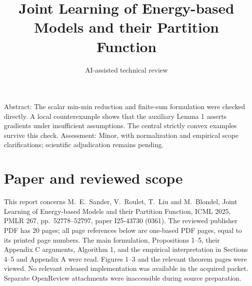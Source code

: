 \documentclass[10pt]{article}
\title{Joint Learning of Energy-based Models and their Partition Function}
\author{AI-assisted technical review}
\date{}
\begin{document}
\maketitle
Abstract: The scalar min-min reduction and finite-sum formulation were checked directly. A local counterexample shows that the auxiliary Lemma 1 asserts gradients under insufficient assumptions. The central strictly convex examples survive this check. Assessment: Minor, with normalization and empirical scope clarifications; scientific adjudication remains pending.\par
\section*{Paper and reviewed scope}
This report concerns M. E. Sander, V. Roulet, T. Liu and M. Blondel, Joint Learning of Energy-based Models and their Partition Function, ICML 2025, PMLR 267, pp. 52778–52797, paper I25-43730 (0361). The reviewed publisher PDF has 20 pages; all page references below are one-based PDF pages, equal to its printed page numbers. The main formulation, Propositions 1–5, their Appendix C arguments, Algorithm 1, and the empirical interpretation in Sections 4–5 and Appendix A were read. Figures 1–3 and the relevant theorem pages were viewed. No relevant released implementation was available in the acquired packet. Separate OpenReview attachments were inaccessible during source preparation.\par
\end{document}

